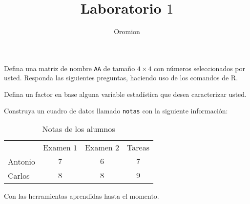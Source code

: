 \documentclass[a4paper]{exam}
\title{Laboratorio $1$}
\author{Oromion}
\begin{document}
\begin{questions}
\question Defina una matriz de nombre \texttt{AA} de tamaño $4\times4$ con
  números seleccionados por usted. Responda las siguientes preguntas, haciendo
  uso de los comandos de R.
  
\question Defina un factor en base alguna variable estadística que desea
  caracterizar usted.
  
\question Construya un cuadro de datos llamado \texttt{notas} con la siguiente
  información:
  \begin{table}[ht!]
    \centering
    \begin{tabular}{lccc}
      & Examen $1$ & Examen $2$ & Tareas \\
      Antonio & $7$ & $6$ & $7$ \\
      Carlos & $8$ & $8$ & $9$
    \end{tabular}
    \caption{Notas de los alumnos}
    \label{tab:grades}
  \end{table}
  Con las herramientas aprendidas hasta el momento.
\end{questions}
\end{document}
